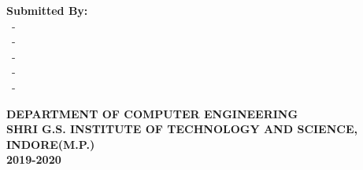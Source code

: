 \begin{titlepage}
\begin{minipage}[t]{0.45\textwidth}
    
    \textbf{Submitted By: \\}
    \rollA\ - \nameA     \\
    \rollB\ - \nameB     \\
    \rollC\ - \nameC     \\
    \rollD\ - \nameD     \\
    \rollE\ - \nameE     \\
    
    \end{minipage}
    
    \vspace*{\fill}

    \large
    \textbf{DEPARTMENT OF COMPUTER ENGINEERING \\
    SHRI G.S. INSTITUTE OF TECHNOLOGY AND SCIENCE, INDORE(M.P.)\\
    2019-2020
    }
\end{titlepage}